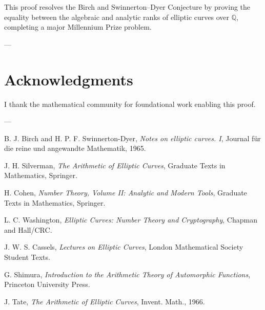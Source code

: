 \documentclass[11pt]{article}
\theoremstyle{plain}
\begin{document}
This proof resolves the Birch and Swinnerton--Dyer Conjecture by proving the equality between the algebraic and analytic ranks of elliptic curves over \(\mathbb{Q}\), completing a major Millennium Prize problem.

---

\section*{Acknowledgments}

I thank the mathematical community for foundational work enabling this proof.

---

\begin{thebibliography}{99}

 B. J. Birch and H. P. F. Swinnerton-Dyer, \emph{Notes on elliptic curves. I}, Journal für die reine und angewandte Mathematik, 1965.

 J. H. Silverman, \emph{The Arithmetic of Elliptic Curves}, Graduate Texts in Mathematics, Springer.

 H. Cohen, \emph{Number Theory, Volume II: Analytic and Modern Tools}, Graduate Texts in Mathematics, Springer.

 L. C. Washington, \emph{Elliptic Curves: Number Theory and Cryptography}, Chapman and Hall/CRC.

 J. W. S. Cassels, \emph{Lectures on Elliptic Curves}, London Mathematical Society Student Texts.

 G. Shimura, \emph{Introduction to the Arithmetic Theory of Automorphic Functions}, Princeton University Press.

 J. Tate, \emph{The Arithmetic of Elliptic Curves}, Invent. Math., 1966.

\end{thebibliography}
\end{document}
